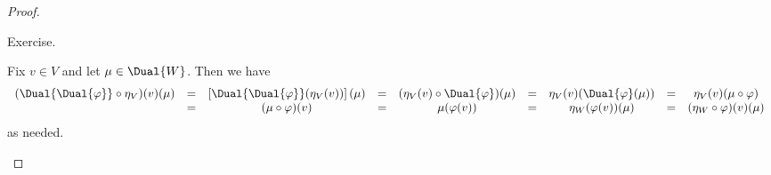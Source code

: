 \documentclass{memoir}
\begin{document}
\begin{proof} \mbox{}
\begin{enumerate*}
\item Exercise.
\item Fix $v \in V$ and let $\mu \in \Dual{W}$. Then we have
\[\begin{array}{ccccccccc}
(\Dual{\Dual{\varphi}} \circ \eta_V)(v)(\mu) & = & \left[ \Dual{\Dual{\varphi}}(\eta_V(v)) \right] (\mu) & = & (\eta_V(v) \circ \Dual{\varphi})(\mu) & = & \eta_V(v)(\Dual{\varphi}(\mu)) & = & \eta_V(v)(\mu \circ \varphi) \\
 & = & (\mu \circ \varphi)(v) & = & \mu(\varphi(v)) & = & \eta_W(\varphi(v))(\mu) & = & (\eta_W \circ \varphi)(v)(\mu)
\end{array}\] as needed. \qedhere
\end{enumerate*}
\end{proof}
\end{document}
